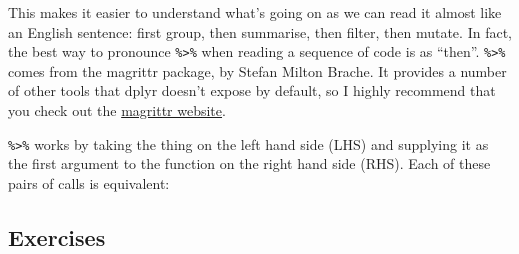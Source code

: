\begin{Shaded}
\end{Shaded}

This makes it easier to understand what's going on as we can read it
almost like an English sentence: first group, then summarise, then
filter, then mutate. In fact, the best way to pronounce
\texttt{\%\textgreater{}\%} when reading a sequence of code is as
``then''. \texttt{\%\textgreater{}\%} comes from the magrittr package,
by Stefan Milton Brache. It provides a number of other tools that dplyr
doesn't expose by default, so I highly recommend that you check out the
\href{https://github.com/smbache/magrittr}{magrittr website}.

\texttt{\%\textgreater{}\%} works by taking the thing on the left hand
side (LHS) and supplying it as the first argument to the function on the
right hand side (RHS). Each of these pairs of calls is equivalent:

\begin{Shaded}
\end{Shaded}

\subsection{Exercises}

